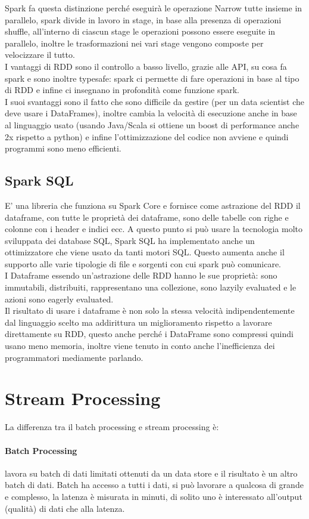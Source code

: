 \documentclass[11pt, twocolumn]{article}
\begin{document}
Spark fa questa distinzione perché eseguirà le operazione Narrow tutte insieme in parallelo, spark divide in lavoro in stage, in base alla presenza di operazioni shuffle, all'interno di ciascun stage le operazioni possono essere eseguite in parallelo, inoltre le trasformazioni nei vari stage vengono composte per velocizzare il tutto.\\
I vantaggi di RDD sono il controllo a basso livello, grazie alle API, su cosa fa spark e sono inoltre typesafe: spark ci permette di fare operazioni in base al tipo di RDD e infine ci insegnano in profondità come funzione spark.\\
I suoi svantaggi sono il fatto che sono difficile da gestire (per un data scientist che deve usare i DataFrames), inoltre cambia la velocità di esecuzione anche in base al linguaggio usato (usando Java/Scala si ottiene un boost di performance anche 2x rispetto a python) e infine l'ottimizzazione del codice non avviene e quindi programmi sono meno efficienti.\\
\subsection{Spark SQL}
E' una libreria che funziona su Spark Core e fornisce come astrazione del RDD il dataframe, con tutte le proprietà dei dataframe, sono delle tabelle con righe e colonne con i header e indici ecc.
A questo punto si può usare la tecnologia molto sviluppata dei database SQL, Spark SQL ha implementato anche un ottimizzatore che viene usato da tanti motori SQL.
Questo aumenta anche il supporto alle varie tipologie di file e sorgenti con cui spark può comunicare.\\
I Dataframe essendo un'astrazione delle RDD hanno le sue proprietà: sono immutabili, distribuiti, rappresentano una collezione, sono lazyily evaluated e le azioni sono eagerly evaluated.\\
Il risultato di usare i dataframe è non solo la stessa velocità indipendentemente dal linguaggio scelto ma addirittura un miglioramento rispetto a lavorare direttamente su RDD, questo anche perché i DataFrame sono compressi quindi usano meno memoria, inoltre viene tenuto in conto anche l'inefficienza dei programmatori mediamente parlando.

\section{Stream Processing}
La differenza tra il batch processing e stream processing è:
\paragraph{Batch Processing} lavora su batch di dati limitati ottenuti da un data store e il risultato è un altro batch di dati. Batch ha accesso a tutti i dati, si può lavorare a qualcosa di grande e complesso, la latenza è misurata in minuti, di solito uno è interessato all'output (qualità) di dati che alla latenza.
\end{document}
